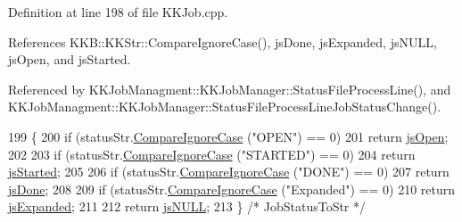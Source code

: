 Definition at line 198 of file K\+K\+Job.\+cpp.



References K\+K\+B\+::\+K\+K\+Str\+::\+Compare\+Ignore\+Case(), js\+Done, js\+Expanded, js\+N\+U\+LL, js\+Open, and js\+Started.



Referenced by K\+K\+Job\+Managment\+::\+K\+K\+Job\+Manager\+::\+Status\+File\+Process\+Line(), and K\+K\+Job\+Managment\+::\+K\+K\+Job\+Manager\+::\+Status\+File\+Process\+Line\+Job\+Status\+Change().


\begin{DoxyCode}
199 \{
200   \textcolor{keywordflow}{if}  (statusStr.\hyperlink{class_k_k_b_1_1_k_k_str_a3fd779d448f27e24170c9c05fca5208e}{CompareIgnoreCase} (\textcolor{stringliteral}{"OPEN"}) == 0)
201     \textcolor{keywordflow}{return}  \hyperlink{class_k_k_job_managment_1_1_k_k_job_afbd631ac794da7bbb00e0406ba89bac4a43e687d064644b4fabf768877c544f27}{jsOpen};
202 
203   \textcolor{keywordflow}{if}  (statusStr.\hyperlink{class_k_k_b_1_1_k_k_str_a3fd779d448f27e24170c9c05fca5208e}{CompareIgnoreCase} (\textcolor{stringliteral}{"STARTED"}) == 0)
204     \textcolor{keywordflow}{return} \hyperlink{class_k_k_job_managment_1_1_k_k_job_afbd631ac794da7bbb00e0406ba89bac4aa844eb2d687af6916f49354626a58974}{jsStarted};
205 
206   \textcolor{keywordflow}{if}  (statusStr.\hyperlink{class_k_k_b_1_1_k_k_str_a3fd779d448f27e24170c9c05fca5208e}{CompareIgnoreCase} (\textcolor{stringliteral}{"DONE"}) == 0)
207     \textcolor{keywordflow}{return} \hyperlink{class_k_k_job_managment_1_1_k_k_job_afbd631ac794da7bbb00e0406ba89bac4adb6ce8574820736dbaa3b0ae115057d2}{jsDone};
208 
209   \textcolor{keywordflow}{if}  (statusStr.\hyperlink{class_k_k_b_1_1_k_k_str_a3fd779d448f27e24170c9c05fca5208e}{CompareIgnoreCase} (\textcolor{stringliteral}{"Expanded"}) == 0)
210     \textcolor{keywordflow}{return} \hyperlink{class_k_k_job_managment_1_1_k_k_job_afbd631ac794da7bbb00e0406ba89bac4a646ee7eb2e67a85d9119f90d5c1a1517}{jsExpanded};
211 
212   \textcolor{keywordflow}{return} \hyperlink{class_k_k_job_managment_1_1_k_k_job_afbd631ac794da7bbb00e0406ba89bac4aea243f8d966fa6b5c37151b483d4a6d3}{jsNULL};
213 \}  \textcolor{comment}{/* JobStatusToStr */}
\end{DoxyCode}

